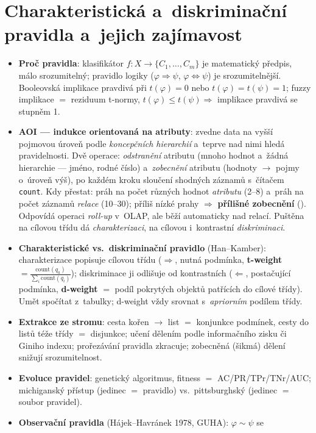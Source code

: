 \documentclass[11pt,a4paper]{article}
\theoremstyle{definition}
\begin{document}
\section{Charakteristická a~diskriminační pravidla a~jejich zajímavost}
\begin{itemize}
\item \textbf{Proč pravidla}: klasifikátor $f\colon X\to\{C_1,\dots,C_m\}$ je
 matematický předpis, málo srozumitelný; pravidlo logiky
 ($\varphi\Rightarrow\psi$, $\varphi\Leftrightarrow\psi$) je srozumitelnější.
 Booleovská implikace pravdivá při $t(\varphi)=0$ nebo $t(\varphi)=t(\psi)=1$;
 fuzzy implikace $=$ reziduum t-normy, $t(\varphi)\le t(\psi)\Rightarrow$
 implikace pravdivá se stupněm 1.
\item \textbf{AOI --- indukce orientovaná na atributy}: zvedne data na vyšší pojmovou
 úroveň podle \emph{koncepčních hierarchií} a~teprve nad nimi hledá pravidelnosti.
 Dvě operace: \emph{odstranění} atributu (mnoho hodnot a~žádná hierarchie --- jméno,
 rodné číslo) a~\emph{zobecnění} atributu (hodnoty $\to$ pojmy o~úroveň výš), po
 každém kroku sloučení shodných záznamů s~čítačem \texttt{count}. Kdy přestat: práh
 na počet různých hodnot \emph{atributu} (2--8) a~práh na počet záznamů \emph{relace}
 (10--30); příliš nízké prahy $\Rightarrow$ \textbf{přílišné zobecnění}
 (). Odpovídá operaci \emph{roll-up} v~OLAP, ale běží
 automaticky nad relací. Puštěna na cílovou třídu dá \emph{charakterizaci}, na
 cílovou i~kontrastní \emph{diskriminaci}.
\item \textbf{Charakteristické vs.\ diskriminační pravidlo} (Han--Kamber):
 charakterizace popisuje cílovou třídu ($\Rightarrow$, nutná podmínka,
 \textbf{t-weight} $=\frac{\mathrm{count}(q_a)}{\sum_i\mathrm{count}(q_i)}$);
 diskriminace ji odlišuje od kontrastních ($\Leftarrow$, postačující podmínka,
 \textbf{d-weight} $=$ podíl pokrytých objektů patřících do cílové třídy). Umět
 spočítat z~tabulky; d-weight vždy srovnat s~\emph{apriorním} podílem třídy.
\item \textbf{Extrakce ze stromu}: cesta kořen $\to$ list $=$ konjunkce podmínek, cesty
 do listů téže třídy $=$ disjunkce; učení dělením podle informačního zisku či
 Giniho indexu; prořezávání pravidla zkracuje; zobecněná (šikmá) dělení snižují
 srozumitelnost.
\item \textbf{Evoluce pravidel}: genetický algoritmus, fitness $=$ AC/PR/TPr/TNr/AUC;
 michiganský přístup (jedinec $=$ pravidlo) vs.\ pittsburghský (jedinec $=$ soubor
 pravidel).
\item \textbf{Observační pravidla} (Hájek--Havránek 1978, GUHA): $\varphi\sim\psi$ se

\end{itemize}
\end{document}

